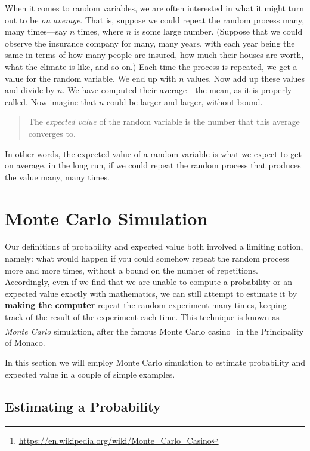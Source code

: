 \documentclass[]{book}
\let\rmarkdownfootnote\footnote%
\def\footnote{\protect\rmarkdownfootnote}
\renewcommand{\href}[2]{#2\footnote{\url{#1}}}
\renewcommand{\href}[2]{#2\footnote{\url{#1}}}
\theoremstyle{definition}
\theoremstyle{definition}
\theoremstyle{definition}
\theoremstyle{remark}
\begin{document}
{When it comes to random variables, we are often interested in what it
might turn out to be \emph{on average}. That is, suppose we could repeat
the random process many, many times---say \(n\) times, where \(n\) is
some large number. (Suppose that we could observe the insurance company
for many, many years, with each year being the same in terms of how many
people are insured, how much their houses are worth, what the climate is
like, and so on.) Each time the process is repeated, we get a value for
the random variable. We end up with \(n\) values. Now add up these
values and divide by \(n\). We have computed their average---the mean,
as it is properly called. Now imagine that \(n\) could be larger and
larger, without bound.

\begin{quote}
The \emph{expected value} of the random variable
is the number that this average converges to.
\end{quote}

In other words, the expected value of a random variable is what we
expect to get on average, in the long run, if we could repeat the random
process that produces the value many, many times.

\section{Monte Carlo Simulation}\label{monte-carlo-simulation}

Our definitions of probability and expected value both involved a
limiting notion, namely: what would happen if you could somehow repeat
the random process more and more times, without a bound on the number of
repetitions. Accordingly, even if we find that we are unable to compute
a probability or an expected value exactly with mathematics, we can
still attempt to estimate it by \textbf{making the computer} repeat the
random experiment many times, keeping track of the result of the
experiment each time. This technique is known as \emph{Monte Carlo}
simulation, after the famous
\href{https://en.wikipedia.org/wiki/Monte_Carlo_Casino}{Monte Carlo
casino} in the Principality of Monaco.

In this section we will employ Monte Carlo simulation to estimate
probability and expected value in a couple of simple examples.

\subsection{Estimating a Probability}\label{estimating-a-probability}

}
\end{document}
